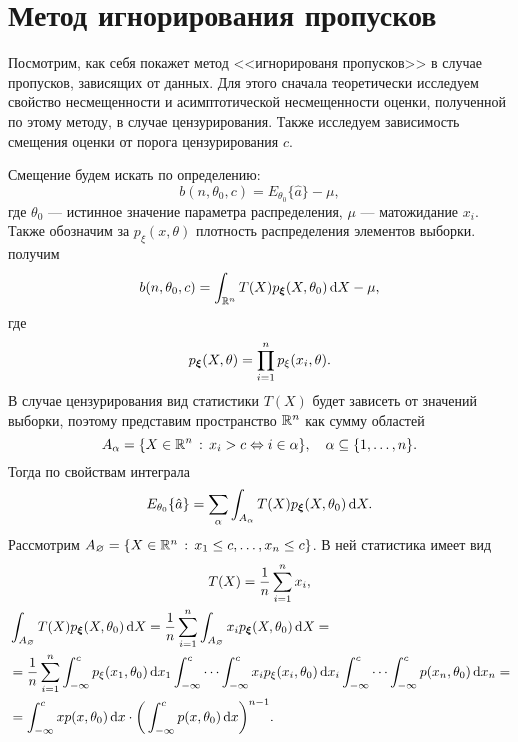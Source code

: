 \section{Метод игнорирования пропусков}

    Посмотрим, как себя покажет метод <<игнорированя пропусков>> в случае пропусков, зависящих от данных. Для этого
    сначала теоретически исследуем свойство несмещенности и асимптотической несмещенности оценки, 
    полученной по этому методу, в случае цензурирования. Также исследуем зависимость смещения оценки от порога
    цензурирования $c$.

    Смещение будем искать по определению:
    \begin{equation*}
        b(n, \theta_0, c) = E_{\theta_0}\{\hat{a}\} - \mu,
    \end{equation*}
    где $\theta_0$ --- истинное значение параметра распределения, $\mu$ --- матожидание $x_i$.
    Также обозначим за $p_\xi(x, \theta)$ плотность распределения элементов выборки. получим
    \begin{equation*}
        b(n, \theta_0, c) = \int_{\mathbb{R}^n}T(X)p_{\boldsymbol{\xi}}(X,\theta_0)\,\mathrm{d} X - \mu,
    \end{equation*}
    где
    \begin{equation*}
        p_{\boldsymbol{\xi}}(X,\theta) = \prod_{i=1}^{n}p_\xi(x_i,\theta).
    \end{equation*}
    В случае цензурирования вид статистики $T(X)$ будет зависеть от значений выборки, поэтому
    представим пространство $\mathbb{R}^n$ как сумму областей
    \begin{equation*}
        A_\alpha = \{X \in \mathbb{R}^n\,:\,x_i > c \Leftrightarrow i \in \alpha\}, \quad \alpha \subseteq \{1,\ldots,n\}.
    \end{equation*}
    Тогда по свойствам интеграла
    \begin{equation*}
        E_{\theta_0}\{\hat{a}\} = \sum_\alpha \int_{A_\alpha}T(X)p_{\boldsymbol{\xi}}(X,\theta_0)\,\mathrm{d} X.
    \end{equation*}
    Рассмотрим $A_\varnothing = \{X \in \mathbb{R}^n\,:\,x_1 \le c,\ldots,x_n \le c\}$. В ней статистика имеет вид
    \begin{gather*}
        T(X) = \frac1n \sum_{i=1}^{n}x_i, \\
        \begin{aligned}
            &\int_{A_\varnothing}T(X)p_{\boldsymbol{\xi}}(X,\theta_0)\,\mathrm{d} X = \frac1n\sum_{i=1}^{n}\int_{A_\varnothing}x_ip_{\boldsymbol{\xi}}(X,\theta_0)\,\mathrm{d} X =\\
            &= \frac1n\sum_{i=1}^{n}\int_{-\infty}^{c}p_\xi(x_1,\theta_0)\,\mathrm{d} x_1\int_{-\infty}^{c}\cdots\int_{-\infty}^{c}x_i p_\xi(x_i,\theta_0)\,\mathrm{d} x_i\int_{-\infty}^{c}\cdots\int_{-\infty}^{c}p(x_n,\theta_0)\,\mathrm{d} x_n =\\
            &= \int_{-\infty}^{c}xp(x,\theta_0)\,\mathrm{d} x \cdot \bigg(\int_{-\infty}^{c}p(x,\theta_0)\,\mathrm{d} x\bigg)^{n-1}.
        \end{aligned}
    \end{gather*}
